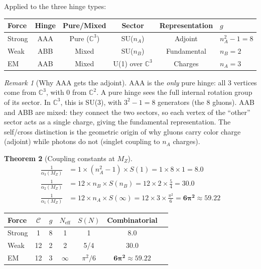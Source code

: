 \documentclass[12pt]{article}
\newtheorem{theorem}{Theorem}[section]
\theoremstyle{remark}
\newtheorem{remark}[theorem]{Remark}
\theoremstyle{definition}
\begin{document}
Applied to the three hinge types:
\begin{center}
\begin{tabular}{lccccl}
\hline
Force & Hinge & Pure/Mixed & Sector & Representation & $g$ \\
\hline
Strong & AAA & Pure ($\mathbb{C}^3$) & SU($n_A$) & Adjoint & $n_A^2 - 1 = 8$ \\
Weak & ABB & Mixed & SU($n_B$) & Fundamental & $n_B = 2$ \\
EM & AAB & Mixed & U(1) over $\mathbb{C}^3$ & Charges & $n_A = 3$ \\
\hline
\end{tabular}
\end{center}

\begin{remark}[Why AAA gets the adjoint]
AAA is the \emph{only} pure hinge: all 3 vertices come from $\mathbb{C}^3$, with 0 from $\mathbb{C}^2$. A pure hinge sees the full internal rotation group of its sector. In $\mathbb{C}^3$, this is SU(3), with $3^2 - 1 = 8$ generators (the 8 gluons). AAB and ABB are mixed: they connect the two sectors, so each vertex of the ``other'' sector acts as a single charge, giving the fundamental representation. The self/cross distinction is the geometric origin of why gluons carry color charge (adjoint) while photons do not (singlet coupling to $n_A$ charges).
\end{remark}

\begin{theorem}[Coupling constants at $M_Z$]
\label{thm:couplings}
\begin{align}
\frac{1}{\alpha_3(M_Z)} &= 1 \times (n_A^2 - 1) \times S(1) = 1 \times 8 \times 1 = \mathbf{8.0} \label{eq:alpha3} \\
\frac{1}{\alpha_2(M_Z)} &= 12 \times n_B \times S(n_B) = 12 \times 2 \times \frac{5}{4} = \mathbf{30.0} \label{eq:alpha2} \\
\frac{1}{\alpha_1(M_Z)} &= 12 \times n_A \times S(\infty) = 12 \times 3 \times \frac{\pi^2}{6} = \mathbf{6\pi^2} \approx 59.22 \label{eq:alpha1}
\end{align}
\end{theorem}

\begin{center}
\begin{tabular}{lcccccc}
\hline
Force & $\mathcal{C}$ & $g$ & $N_\text{eff}$ & $S(N)$ & Combinatorial \\
\hline
Strong & 1 & 8 & 1 & 1 & $\mathbf{8.0}$ \\
Weak & 12 & 2 & 2 & 5/4 & $\mathbf{30.0}$ \\
EM & 12 & 3 & $\infty$ & $\pi^2/6$ & $\mathbf{6\pi^2} \approx 59.22$ \\
\hline
\end{tabular}
\end{center}
\end{document}
